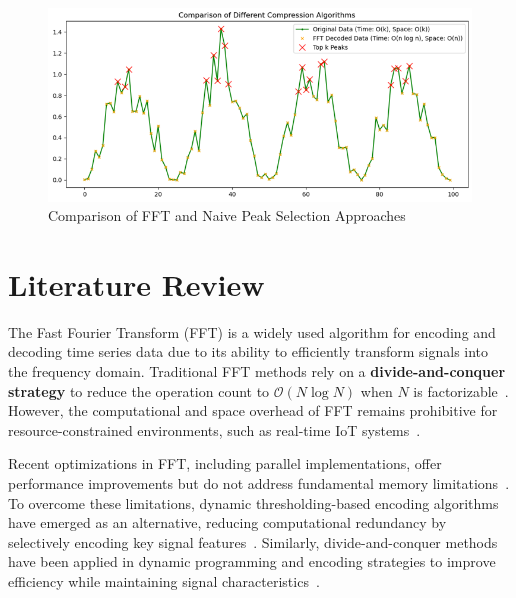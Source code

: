 \documentclass[onecolumn,conference]{IEEEtran}
\begin{document}
\begin{figure}[!h]
    \centering
    \includegraphics[width=0.9\linewidth, height=0.7\linewidth, keepaspectratio]{images/RPBC intro fig.png}
    \caption{Comparison of FFT and Naive Peak Selection Approaches}
    \label{fig:compression_algorithm}
\end{figure}

\section{Literature Review}
The Fast Fourier Transform (FFT) is a widely used algorithm for encoding and decoding time series data due to its ability to efficiently transform signals into the frequency domain. Traditional FFT methods rely on a \textbf{divide-and-conquer strategy} to reduce the operation count to $\mathcal{O}(N \log N)$ when $N$ is factorizable~\cite{Gough2010FFT}. However, the computational and space overhead of FFT remains prohibitive for resource-constrained environments, such as real-time IoT systems~\cite{Thomas2021A}.

Recent optimizations in FFT, including parallel implementations, offer performance improvements but do not address fundamental memory limitations~\cite{Zhang2013Design}. To overcome these limitations, dynamic thresholding-based encoding algorithms have emerged as an alternative, reducing computational redundancy by selectively encoding key signal features~\cite{Cornforth2012Symbolic}. Similarly, divide-and-conquer methods have been applied in dynamic programming and encoding strategies to improve efficiency while maintaining signal characteristics~\cite{Itzhaky2016Deriving}.
\end{document}
